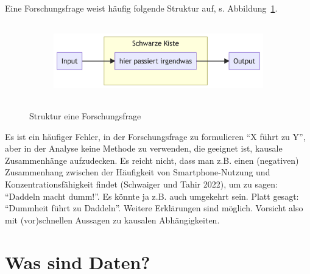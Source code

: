 \documentclass[
  a4paper,
  DIV=11]{scrreprt}
\theoremstyle{definition}
\theoremstyle{definition}
\theoremstyle{remark}
\begin{document}
Eine Forschungsfrage weist häufig folgende Struktur auf, s.
Abbildung~\ref{fig-fo-struktur}.

\begin{figure}

{\centering 

\begin{figure}[H]

{\centering \includegraphics[width=4.99in,height=1.3in]{./fragenstellen_files/figure-latex/mermaid-figure-4.png}

}

\end{figure}

}

\caption{\label{fig-fo-struktur}Struktur eine Forschungsfrage}

\end{figure}

\begin{tcolorbox}[enhanced jigsaw, titlerule=0mm, bottomrule=.15mm, opacitybacktitle=0.6, colframe=quarto-callout-caution-color-frame, title=\textcolor{quarto-callout-caution-color}{\faFire}\hspace{0.5em}{Vorsicht}, coltitle=black, colback=white, arc=.35mm, breakable, toptitle=1mm, opacityback=0, bottomtitle=1mm, left=2mm, leftrule=.75mm, rightrule=.15mm, toprule=.15mm, colbacktitle=quarto-callout-caution-color!10!white]

Es ist ein häufiger Fehler, in der Forschungsfrage zu formulieren ``X
führt zu Y'', aber in der Analyse keine Methode zu verwenden, die
geeignet ist, kausale Zusammenhänge aufzudecken. Es reicht nicht, dass
man z.B. einen (negativen) Zusammenhang zwischen der Häufigkeit von
Smartphone-Nutzung und Konzentrationsfähigkeit findet (Schwaiger und
Tahir 2022), um zu sagen: ``Daddeln macht dumm!''. Es könnte ja z.B.
auch umgekehrt sein. Platt gesagt: ``Dummheit führt zu Daddeln''.
Weitere Erklärungen sind möglich. Vorsicht also mit (vor)schnellen
Aussagen zu kausalen Abhängigkeiten.

\end{tcolorbox}

\hypertarget{was-sind-daten}{%
\section{Was sind Daten?}\label{was-sind-daten}}
\end{document}
